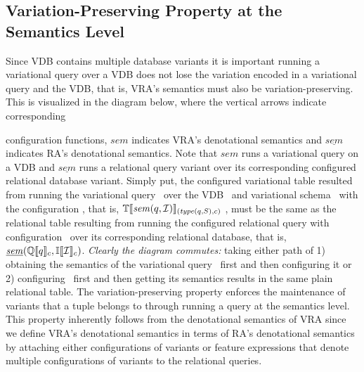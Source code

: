 \subsection{Variation-Preserving Property at the Semantics Level}
\label{sec:var-pres-sem}

Since VDB contains multiple database variants
it is important running a variational query over a  VDB  does not lose the variation 
encoded in a variational query and the VDB, that is, VRA's semantics
must also be variation-preserving. This is visualized in the diagram below,
where the vertical arrows indicate corresponding
%
\begin{wrapfigure}{r}{0.24\textwidth}
\begin{center}
\end{center}
\end{wrapfigure}
%
 configuration functions,
$\mathit{sem}$ indicates VRA's denotational semantics and 
$\underline{\mathit{sem}}$ indicates RA's denotational semantics. 
Note that $\mathit{sem}$ runs a variational query on a VDB and 
$\underline{\mathit{sem}}$ runs a relational query variant over its corresponding
configured relational database variant. 
%
Simply put, the configured variational table
resulted from running the variational query \vQ\ over the
VDB \vdbInst\ and variational schema \vSch\ with the configuration \config, that is, 
$\otSem {\mathit{type} (\vQ, \vSch)} {\mathit{sem} (\vQ, \vdbInst)}$ , 
must be the same as the relational table resulting from running the configured
relational query with configuration \config\ over its corresponding relational 
database, that is, $\mathit{\underline{sem}} (\eeSem \vQ, \odbSem \vdbInst)$.
%
\emph{Clearly the diagram commutes:} taking either path of 1) obtaining the 
semantics of the variational query \constrain \vQ\ first and then configuring it 
or 2)  configuring \constrain \vQ\ first and then getting its semantics
results in the same plain relational table. 
%
The variation-preserving property enforces the maintenance of variants that a 
tuple belongs to through running a query at the semantics level. 
%
This property inherently follows from the denotational semantics of VRA since
we define VRA's denotational semantics in terms of RA's denotational semantics
by attaching either configurations of variants or feature expressions that denote
multiple configurations of variants to the relational queries. 

